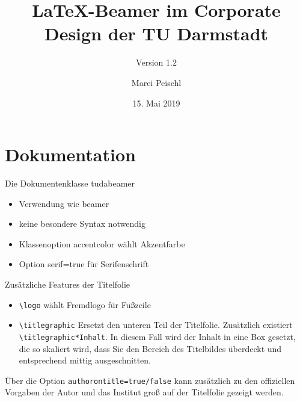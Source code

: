 \documentclass[
	ngerman,%
	aspectratio=169,%
	color={accentcolor=2d},
	logo=false,%
	colorframetitle=true,%
	]{tudabeamer}
\let\code\texttt
\begin{document}
\title{LaTeX-Beamer im Corporate Design der TU Darmstadt}
\subtitle{Version 1.2}
\author[M. Peischl]{Marei Peischl}
\department{\TeX/\LaTeX}




\date{15. Mai 2019}

\maketitle


\section{Dokumentation}
\begin{frame}{Die Dokumentenklasse tudabeamer}
\begin{itemize}
	\item Verwendung wie beamer
	\item keine besondere Syntax notwendig
	\item Klassenoption accentcolor wählt Akzentfarbe
	\item Option serif=true für Serifenschrift
\end{itemize}
\end{frame}

\begin{frame}{Zusätzliche Features der Titelfolie}
\begin{itemize}
	\item \code{\textbackslash{}logo} wählt Fremdlogo für Fußzeile
	\item \code{\textbackslash{}titlegraphic} Ersetzt den unteren Teil der Titelfolie. Zusätzlich existiert \code{\textbackslash{}titlegraphic*{Inhalt}}.
	In diesem Fall wird der Inhalt in eine Box gesetzt, die so skaliert wird, dass Sie den Bereich des Titelbildes überdeckt und entsprechend mittig ausgeschnitten.
\end{itemize}
	Über die Option \code{authorontitle=true/false} kann zusätzlich zu den offiziellen Vorgaben der Autor und das Institut groß auf der Titelfolie gezeigt werden.
\end{frame}
\end{document}
